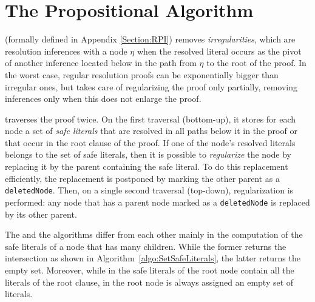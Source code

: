 \section{The Propositional Algorithm}

{\RPI} (formally defined in Appendix \ref{Section:RPI}) removes \emph{irregularities}, which are resolution inferences with a node $\eta$ when the resolved literal occurs as the pivot of another inference located below in the path from $\eta$ to the root of the proof. In the worst case, regular resolution proofs can be exponentially bigger than irregular ones, but {\RPI} takes care of regularizing the proof only partially, removing inferences only when this does not enlarge the proof.

{\RPI} traverses the proof twice. On the first traversal (bottom-up), it stores for each node a set of \emph{safe literals} that are resolved in all paths below it in the proof or that occur in the root clause of the proof. If one of the node's resolved literals belongs to the set of safe literals, then it is possible to \emph{regularize} the node by replacing it by the parent containing the safe literal. To do this replacement efficiently, the replacement is postponed by marking the other parent as a \texttt{deletedNode}. Then, on a single second traversal (top-down), regularization is performed: any node that has a parent node marked as a \texttt{deletedNode} is replaced by its other parent.

The {\RPI} and the {\RP} algorithms differ from each other mainly in the
computation of the safe literals of a node that has many children. While the former 
returns the intersection as shown in Algorithm~\ref{algo:SetSafeLiterals}, the latter
returns the empty set. 
Moreover, while in {\RPI} the safe literals of the root node contain all the literals of the root clause, in {\RP} the root node is always assigned an empty set of literals. 